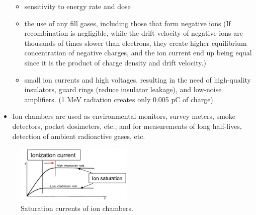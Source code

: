 \begin{itemize}
    \begin{itemize}
        \item sensitivity to energy rate and dose
        \item the use of any fill gases, including those that form negative ions (If recombination is negligible, while the drift velocity of negative ions are thousands of times slower than electrons, they create higher equilibrium concentration of negative charges, and the ion current end up being equal since it is the product of charge density and drift velocity.)
        \item small ion currents and high voltages, resulting in the need of high-quality insulators, guard rings (reduce insulator leakage), and low-noise amplifiers. (1 MeV radiation creates only 0.005 pC of charge)
    \end{itemize}
    \item Ion chambers are used as environmental monitors, survey meters, smoke detectors,  pocket dosimeters, etc., and for measurements of long half-lives, detection of ambient radioactive gases, etc. 
\end{itemize}
\begin{figure}[ht]
    \centering
    \includegraphics[width=0.5\textwidth]{images/ion_chamber_saturation_current.png}
    \caption{Saturation currents of ion chambers.}
    \label{fig:ion_chamber_saturation_current}
\end{figure}
